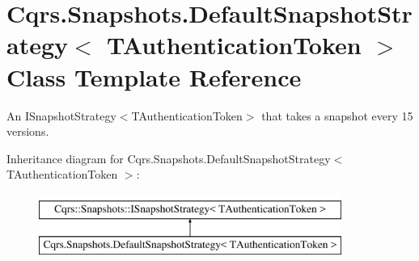 \hypertarget{classCqrs_1_1Snapshots_1_1DefaultSnapshotStrategy}{}\section{Cqrs.\+Snapshots.\+Default\+Snapshot\+Strategy$<$ T\+Authentication\+Token $>$ Class Template Reference}
\label{classCqrs_1_1Snapshots_1_1DefaultSnapshotStrategy}


An I\+Snapshot\+Strategy$<$\+T\+Authentication\+Token$>$ that takes a snapshot every 15 versions.  


Inheritance diagram for Cqrs.\+Snapshots.\+Default\+Snapshot\+Strategy$<$ T\+Authentication\+Token $>$\+:\begin{figure}[H]
\begin{center}
\leavevmode
\includegraphics[height=2.000000cm]{classCqrs_1_1Snapshots_1_1DefaultSnapshotStrategy}
\end{center}
\end{figure}
